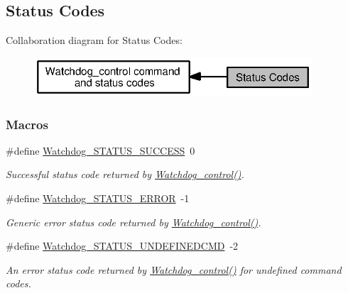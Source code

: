 \subsection{Status Codes}
\label{group___watchdog___s_t_a_t_u_s}
Collaboration diagram for Status Codes\+:
\nopagebreak
\begin{figure}[H]
\begin{center}
\leavevmode
\includegraphics[width=293pt]{group___watchdog___s_t_a_t_u_s}
\end{center}
\end{figure}
\subsubsection*{Macros}
\begin{DoxyCompactItemize}
\item 
\#define \hyperlink{group___watchdog___s_t_a_t_u_s_gaa8dd490de97398b1da33798d8e54b53f}{Watchdog\+\_\+\+S\+T\+A\+T\+U\+S\+\_\+\+S\+U\+C\+C\+E\+S\+S}~0
\begin{DoxyCompactList}\small\item\em Successful status code returned by \hyperlink{_watchdog_8h_aa98a75361edb1e476432669169f2950e}{Watchdog\+\_\+control()}. \end{DoxyCompactList}\item 
\#define \hyperlink{group___watchdog___s_t_a_t_u_s_ga7cc28c1119ebecae88a5ae0735228489}{Watchdog\+\_\+\+S\+T\+A\+T\+U\+S\+\_\+\+E\+R\+R\+O\+R}~-\/1
\begin{DoxyCompactList}\small\item\em Generic error status code returned by \hyperlink{_watchdog_8h_aa98a75361edb1e476432669169f2950e}{Watchdog\+\_\+control()}. \end{DoxyCompactList}\item 
\#define \hyperlink{group___watchdog___s_t_a_t_u_s_ga589be79a7f8ce642863f231e1dae7577}{Watchdog\+\_\+\+S\+T\+A\+T\+U\+S\+\_\+\+U\+N\+D\+E\+F\+I\+N\+E\+D\+C\+M\+D}~-\/2
\begin{DoxyCompactList}\small\item\em An error status code returned by \hyperlink{_watchdog_8h_aa98a75361edb1e476432669169f2950e}{Watchdog\+\_\+control()} for undefined command codes. \end{DoxyCompactList}\end{DoxyCompactItemize}


